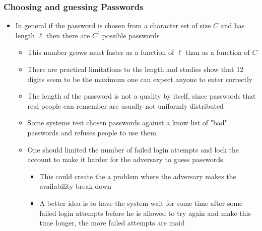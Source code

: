 \documentclass[11pt]{article}
\begin{document}
\subsubsection{Choosing and guessing Passwords}
\label{sec:orgae1020d}
\begin{itemize}
\item In general if the password is chosen from a character set of size \(C\) and has length \(\ell\) then there are \(C^\ell\) possible passwords
\begin{itemize}
\item This number grows must faster as a function of \(\ell\) than as a function of \(C\)
\item There are practical limitations to the length and studies show that 12 digits seem to be the maximum one can expect anyone to enter correctly
\item The length of the password is not a quality by itself, since passwords that real people can remember are usually not uniformly distributed
\item Some systems test chosen passwords against a know list of "bad" passwords and refuses people to use them
\item One should limited the number of failed login attempts and lock the account to make it harder for the adversary to guess passwords
\begin{itemize}
\item This could create the a problem where the adversary makes the availability break down
\item A better idea is to have the system wait for some time after some failed login attempts before he is allowed to try again and make this time longer, the more failed attempts are maid
\end{itemize}
\end{itemize}
\end{itemize}
\end{document}
